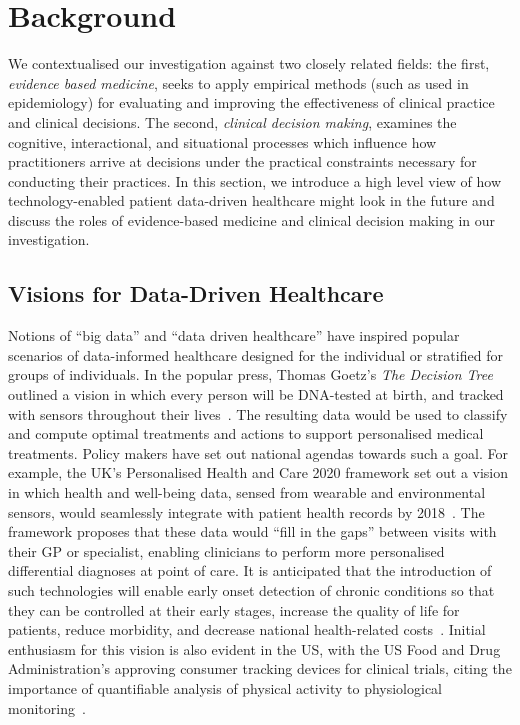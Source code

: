 \documentclass{sigchi}
\begin{document}
\section{Background} 

We contextualised our investigation against two closely related fields: the first, \emph{evidence based medicine}, seeks to apply empirical methods (such as used in epidemiology) for evaluating and improving the effectiveness of clinical practice and clinical decisions.  The second, \emph{clinical decision making}, examines the cognitive, interactional, and situational processes which influence how practitioners arrive at decisions under the practical constraints necessary for conducting their practices.  In this section, we introduce a high level view of how technology-enabled patient data-driven healthcare might look in the future and discuss the roles of evidence-based medicine and clinical decision making in our investigation.

\subsection{Visions for Data-Driven Healthcare} %
Notions of ``big data'' and ``data driven healthcare'' have inspired popular scenarios  of data-informed healthcare designed for the individual or stratified for groups of individuals. In the popular press, Thomas Goetz's \emph{The Decision Tree} outlined a vision in which every person will be DNA-tested at birth, and tracked with sensors throughout their lives~\cite{goetz_decision_2011}. The resulting data would be used to classify and compute optimal treatments and actions to support personalised medical treatments. Policy makers have set out national agendas towards such a goal. For example, the UK's Personalised Health and Care 2020 framework set out a vision in which health and well-being data, sensed from wearable and environmental sensors, would seamlessly integrate with patient health records by 2018~\cite{Personalised2014}.  The framework proposes that these data would ``fill in the gaps'' between visits with their GP or specialist, enabling clinicians to perform more personalised differential diagnoses at point of care.  It is anticipated that the introduction of such technologies will enable early onset detection of chronic conditions so that they can be controlled at their early stages, increase the quality of life for patients, reduce morbidity, and decrease national health-related costs~\cite{Swan2009}.   Initial enthusiasm for this vision is also evident in the US, with the US Food and Drug Administration's approving  consumer tracking devices for clinical trials, citing the importance of quantifiable analysis of physical activity to physiological monitoring~\cite{U.S.FoodandDrugAdministration2014}. %
\end{document}
